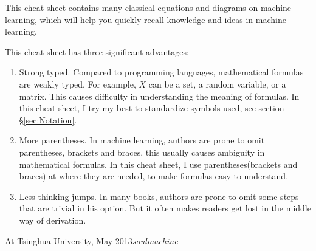 %
%

\preface

This cheat sheet contains many classical equations and diagrams on machine learning, which will help you quickly recall knowledge and ideas in machine learning.

This cheat sheet has three significant advantages:
\begin{enumerate}
\item Strong typed. Compared to programming languages, mathematical formulas are weakly typed. For example, $X$ can be a set, a random variable, or a matrix. This causes difficulty in understanding the meaning of formulas. In this cheat sheet, I try my best to standardize symbols used, see section \S \ref{sec:Notation}.
\item More parentheses. In machine learning, authors are prone to omit parentheses, brackets and braces,  this usually causes ambiguity in mathematical formulas. In this cheat sheet, I use parentheses(brackets and braces) at where they are needed, to make formulas easy to understand.
\item Less thinking jumps. In many books, authors are prone to omit some steps that are trivial in his option. But it often makes readers get lost in the middle way of derivation.
\end{enumerate}

\vspace{\baselineskip}
\begin{flushright}\noindent
At Tsinghua University, May 2013\hfill {\it soulmachine} \\
\end{flushright}


